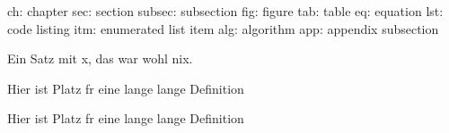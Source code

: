 ch:		chapter
sec:	section
subsec:	subsection
fig:	figure
tab:	table
eq:		equation
lst:	code listing
itm:	enumerated list item
alg:	algorithm
app:	appendix subsection


\begin{theorem}
Ein Satz mit x, das war wohl nix.
\end{theorem}
\begin{definition}
Hier ist Platz fr eine lange lange Definition
\end{definition}
\begin{lemma}
Hier ist Platz fr eine lange lange Definition
\end{lemma}

\noindent{}